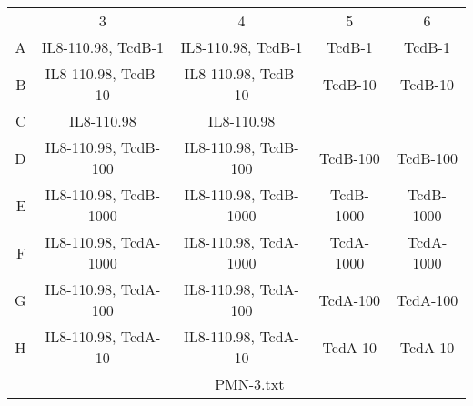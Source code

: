 \begin{adjustwidth}{0in}{0.1in}
{{\begin{tabular}{r|c|c|c|c|}
  \multicolumn{1}{c}{\multirow{ 1 }{*}{  }} & \multicolumn{1}{c}{3} & \multicolumn{1}{c}{4} & \multicolumn{1}{c}{5} & \multicolumn{1}{c}{6} \\ 
  \cline{2-5}\multirow{ 1 }{*}{ A } & IL8-110.98, TcdB-1 & IL8-110.98, TcdB-1 & TcdB-1 & TcdB-1 \\ 
  \cline{2-5}\multirow{ 1 }{*}{ B } & IL8-110.98, TcdB-10 & IL8-110.98, TcdB-10 & TcdB-10 & TcdB-10 \\ 
  \cline{2-5}\multirow{ 1 }{*}{ C } & IL8-110.98 & IL8-110.98 &  &  \\ 
  \cline{2-5}\multirow{ 1 }{*}{ D } & IL8-110.98, TcdB-100 & IL8-110.98, TcdB-100 & TcdB-100 & TcdB-100 \\ 
  \cline{2-5}\multirow{ 1 }{*}{ E } & IL8-110.98, TcdB-1000 & IL8-110.98, TcdB-1000 & TcdB-1000 & TcdB-1000 \\ 
  \cline{2-5}\multirow{ 1 }{*}{ F } & IL8-110.98, TcdA-1000 & IL8-110.98, TcdA-1000 & TcdA-1000 & TcdA-1000 \\ 
  \cline{2-5}\multirow{ 1 }{*}{ G } & IL8-110.98, TcdA-100 & IL8-110.98, TcdA-100 & TcdA-100 & TcdA-100 \\ 
  \cline{2-5}\multirow{ 1 }{*}{ H } & IL8-110.98, TcdA-10 & IL8-110.98, TcdA-10 & TcdA-10 & TcdA-10 \\ 
   \cline{2-5} \multicolumn{1}{c}{} & \multicolumn{4}{c}{PMN-3.txt}\end{tabular}
}
}
\end{adjustwidth}
